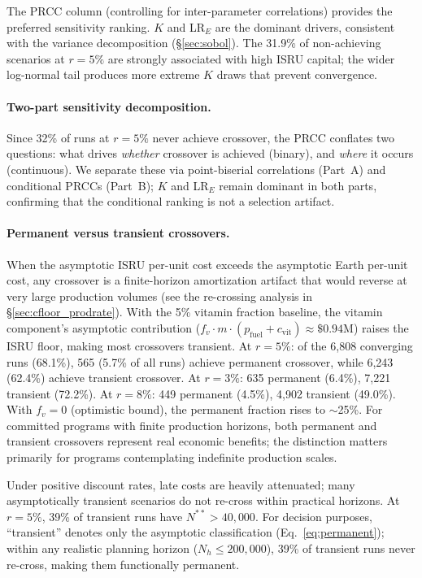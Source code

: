 \documentclass[preprint,12pt]{elsarticle}
\begin{document}
The PRCC column (controlling for inter-parameter correlations) provides the preferred sensitivity ranking. $K$ and LR$_E$ are the dominant drivers, consistent with the variance decomposition (\S\ref{sec:sobol}). The 31.9\% of non-achieving scenarios at $r = 5\%$ are strongly associated with high ISRU capital; the wider log-normal tail produces more extreme $K$ draws that prevent convergence.

\paragraph{Two-part sensitivity decomposition.} Since 32\% of runs at $r = 5\%$ never achieve crossover, the PRCC conflates two questions: what drives \emph{whether} crossover is achieved (binary), and \emph{where} it occurs (continuous). We separate these via point-biserial correlations (Part~A) and conditional PRCCs (Part~B); $K$ and LR$_E$ remain dominant in both parts, confirming that the conditional ranking is not a selection artifact.

\paragraph{Permanent versus transient crossovers.} When the asymptotic ISRU per-unit cost exceeds the asymptotic Earth per-unit cost, any crossover is a finite-horizon amortization artifact that would reverse at very large production volumes (see the re-crossing analysis in \S\ref{sec:cfloor_prodrate}). With the 5\% vitamin fraction baseline, the vitamin component's asymptotic contribution ($f_v \cdot m \cdot (p_{\mathrm{fuel}} + c_{\mathrm{vit}}) \approx \$0.94$M) raises the ISRU floor, making most crossovers transient. At $r = 5\%$: of the 6{,}808 converging runs (68.1\%), 565 (5.7\% of all runs) achieve permanent crossover, while 6{,}243 (62.4\%) achieve transient crossover. At $r = 3\%$: 635 permanent (6.4\%), 7{,}221 transient (72.2\%). At $r = 8\%$: 449 permanent (4.5\%), 4{,}902 transient (49.0\%). With $f_v = 0$ (optimistic bound), the permanent fraction rises to $\sim$25\%. For committed programs with finite production horizons, both permanent and transient crossovers represent real economic benefits; the distinction matters primarily for programs contemplating indefinite production scales.

Under positive discount rates, late costs are heavily attenuated; many asymptotically transient scenarios do not re-cross within practical horizons. At $r = 5\%$, 39\% of transient runs have $N^{**} > 40{,}000$. For decision purposes, ``transient'' denotes only the asymptotic classification (Eq.~\ref{eq:permanent}); within any realistic planning horizon ($N_h \leq 200{,}000$), 39\% of transient runs never re-cross, making them functionally permanent.
\end{document}
